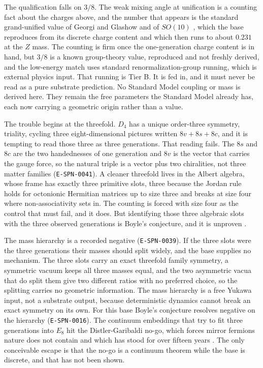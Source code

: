 The qualification falls on $3/8$. The weak mixing angle at unification is a
counting fact about the charges above, and the number that appears is the
standard grand-unified value of Georgi and Glashow and of $SO(10)$
\cite{georgi1974}, which the base reproduces from its discrete charge content and
which then runs to about $0.231$ at the $Z$ mass. The counting is firm once the
one-generation charge content is in hand, but $3/8$ is a known group-theory
value, reproduced and not freshly derived, and the low-energy match uses standard
renormalization-group running, which is external physics input. That running is
Tier B. It is fed in, and it must never be read as a pure substrate prediction.
No Standard Model coupling or mass is derived here. They remain the free
parameters the Standard Model already has, each now carrying a geometric origin
rather than a value.

The trouble begins at the threefold. $D_4$ has a unique order-three symmetry,
triality, cycling three eight-dimensional pictures written $8v + 8s + 8c$, and it
is tempting to read those three as three generations. That reading fails. The
$8s$ and $8c$ are the two handednesses of one generation and $8v$ is the vector
that carries the gauge force, so the natural triple is a vector plus two
chiralities, not three matter families (\texttt{E-SPN-0041}). A cleaner threefold lives in
the Albert algebra, whose frame has exactly three primitive slots, three because
the Jordan rule holds for octonionic Hermitian matrices up to size three and
breaks at size four where non-associativity sets in. The counting is forced with
size four as the control that must fail, and it does. But identifying those three
algebraic slots with the three observed generations is Boyle's conjecture, and it
is unproven \cite{boyle2020}.

The mass hierarchy is a recorded negative (\texttt{E-SPN-0039}). If the three slots were
the three generations their masses should split widely, and the base supplies no
mechanism. The three slots carry an exact threefold family symmetry, a symmetric
vacuum keeps all three masses equal, and the two asymmetric vacua that do split
them give two different ratios with no preferred choice, so the splitting carries
no geometric information. The mass hierarchy is a free Yukawa input, not a
substrate output, because deterministic dynamics cannot break an exact symmetry
on its own. For this base Boyle's conjecture resolves negative on the hierarchy
(\texttt{E-SPN-0016}). The continuum embeddings that try to fit three generations into
$E_8$ hit the Distler-Garibaldi no-go, which forces mirror fermions nature does
not contain and which has stood for over fifteen years \cite{distler2010}. The
only conceivable escape is that the no-go is a continuum theorem while the base is
discrete, and that has not been shown.

